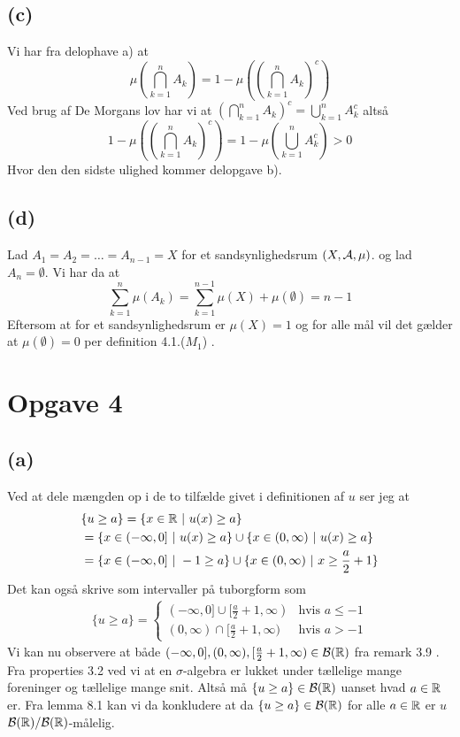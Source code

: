 \documentclass{article}
\begin{document}
\subsection*{(c)}
Vi har fra delophave a) at
\[
    \mu( \bigcap_{k=1}^{n} A_k) = 1 - \mu( \left( \bigcap_{k=1}^{n} A_k \right)^{c})
\]
Ved brug af De Morgans lov har vi at $\left( \bigcap_{k=1}^{n} A_k \right)^{c} = \bigcup_{k=1}^{n} A_k^{c}$ altså
\[
    1 - \mu( \left( \bigcap_{k=1}^{n} A_k \right)^{c}) = 1 - \mu( \bigcup_{k=1}^{n} A_k^{c}) > 0
\]
Hvor den den sidste ulighed kommer delopgave b).

\subsection*{(d)}
Lad $A_1 = A_2 = \dots = A_{n-1} = X$ for et sandsynlighedsrum $(X, \mathcal{A}, \mu)$.
og lad $A_n = \emptyset$. Vi har da at 
\[
    \sum_{k=1}^{n} \mu(A_k) = 
    \sum_{k=1}^{n-1} \mu(X) + \mu(\emptyset) = 
    n - 1
\]
Eftersom at for et sandsynlighedsrum er $\mu(X) = 1$ og for 
alle mål vil det gælder at $\mu(\emptyset) = 0$ per definition 4.1.($M_1$) \cite{lim}.

\section*{Opgave 4}
\subsection*{(a)}
Ved at dele mængden op i de to tilfælde givet i definitionen af $u$ ser jeg at
\begin{align*}
&\{u \ge a \} = 
\{x \in \mathbb{R} \text{ } | \text{ } u(x) \ge a \} \\ 
&=\{x \in (-\infty,0] \text{ } | \text{ } u(x) \ge a \} \cup \{x \in (0,\infty) \text{ } | \text{ } u(x) \ge a \} \\
&=\{x \in (-\infty,0] \text{ } | \text{ }  -1 \ge a \} \cup \{x \in (0,\infty) \text{ } | \text{ } x \ge \frac{a}{2}+1 \} \\
\end{align*}
Det kan også skrive som intervaller på tuborgform som
\begin{align*}
\{ u \ge a \} = 
    \begin{cases}
        (-\infty,0] \cup [\frac{a}{2} + 1, \infty) & \text{hvis } a \le -1 \\
        (0, \infty) \cap [\frac{a}{2}+1, \infty) & \text{hvis } a > -1
    \end{cases}
\end{align*}
Vi kan nu observere at både
$(-\infty, 0],(0,\infty), [\frac{a}{2}+1, \infty) \in \mathcal{B}(\mathbb{R})$ fra remark 3.9 \cite{lim}.
Fra properties 3.2 ved vi at en $\sigma$-algebra er lukket under tællelige mange
foreninger og tællelige mange snit. Altså må $\{u \ge a\} \in \mathcal{B}(\mathbb{R})$ uanset
hvad $a \in \mathbb{R}$ er.
Fra lemma 8.1 \cite{lim} kan vi da konkludere at da 
$\{u \ge a \} \in \mathcal{B}(\mathbb{R})$ for alle $a \in \mathbb{R}$
er $u$ $\mathcal{B}(\mathbb{R}) / \mathcal{B}(\mathbb{R})$-målelig.
\end{document}
